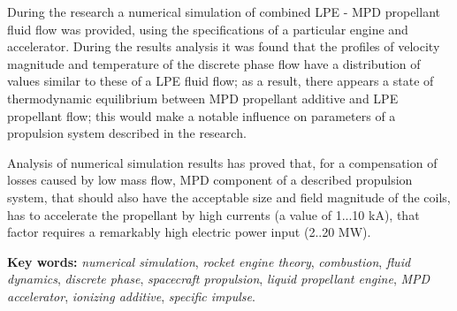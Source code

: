 During the research a numerical simulation of combined LPE - MPD propellant fluid flow was provided, using the specifications of a particular engine and accelerator. During the results analysis it was found that the profiles of velocity magnitude and temperature of the discrete phase flow have a distribution of values similar to these of a LPE fluid flow; as a result, there appears a state of thermodynamic equilibrium between MPD propellant additive and LPE propellant flow; this would make a notable influence on parameters of a propulsion system described in the research.

Analysis of numerical simulation results has proved that, for a compensation of losses caused by low mass flow, MPD component of a described propulsion system, that should also have the acceptable size and field magnitude of the coils, has to accelerate the propellant by high currents (a value of 1...10 kA), that factor requires a remarkably high electric power input (2..20 MW).


\vspace*{5mm}%
\textbf{Key words:} \textit{numerical simulation}, \textit{rocket engine theory}, \textit{combustion}, \textit {fluid dynamics}, \textit {discrete phase}, \textit{spacecraft propulsion}, \textit{liquid propellant engine}, \textit{MPD accelerator}, \textit{ionizing additive}, \textit{specific impulse}.




